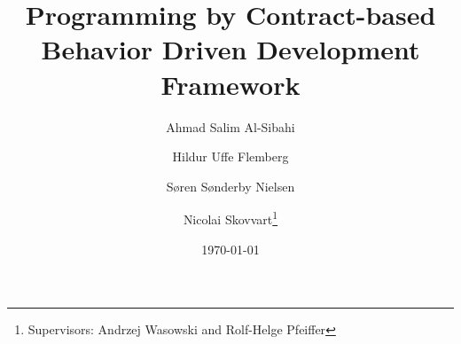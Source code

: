 \documentclass{llncs}
\begin{document}
\title{Programming by Contract-based Behavior Driven Development Framework}
\author{Ahmad Salim Al-Sibahi \and Hildur Uffe Flemberg \and S\o ren S\o nderby Nielsen \and Nicolai Skovvart\thanks{Supervisors: Andrzej Wasowski and Rolf-Helge Pfeiffer}}
\date{\today}

\maketitle


























\appendix
\end{document}
